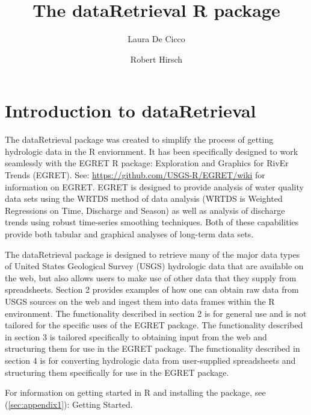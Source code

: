 \documentclass[a4paper,11pt]{article}\usepackage[]{graphicx}\usepackage[]{color}
\begin{document}
\title{The dataRetrieval R package}
\author[1]{Laura De Cicco}
\author[1]{Robert Hirsch}






\maketitle
\tableofcontents

\section{Introduction to dataRetrieval}
The dataRetrieval package was created to simplify the process of getting hydrologic data in the R enviornment. It has been specifically designed to work seamlessly with the EGRET R package: Exploration and Graphics for RivEr Trends (EGRET). See: \url{https://github.com/USGS-R/EGRET/wiki} for information on EGRET. EGRET is designed to provide analysis of water quality data sets using the WRTDS method of data analysis (WRTDS is Weighted Regressions on Time, Discharge and Season) as well as analysis of discharge trends using robust time-series smoothing techniques.  Both of these capabilities provide both tabular and graphical analyses of long-term data sets.


The dataRetrieval package is designed to retrieve many of the major data types of United States Geological Survey (USGS) hydrologic data that are available on the web, but also allows users to make use of other data that they supply from spreadsheets.  Section 2 provides examples of how one can obtain raw data from USGS sources on the web and ingest them into data frames within the R environment.  The functionality described in section 2 is for general use and is not tailored for the specific uses of the EGRET package.  The functionality described in section 3 is tailored specifically to obtaining input from the web and structuring them for use in the EGRET package.  The functionality described in section 4 is for converting hydrologic data from user-supplied spreadsheets and structuring them specifically for use in the EGRET package.

For information on getting started in R and installing the package, see (\ref{sec:appendix1}): Getting Started.
\end{document}
